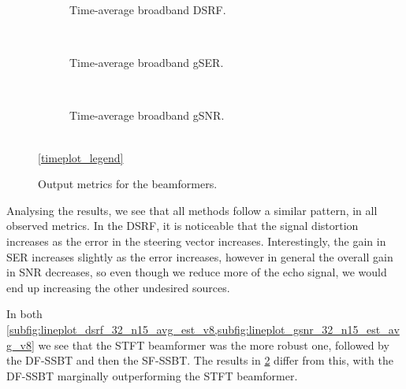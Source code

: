 \begin{figure}[!t]
	\centering
	\begin{subfigure}{\textwidth}
		\centering
		
		\caption{Time-average broadband DSRF.}
		\label{subfig:lineplot_dsrf_32_n15_avg_est_v8}
	\end{subfigure}\\[1em]
	\begin{subfigure}{\textwidth}
		\centering
		
		\caption{Time-average broadband gSER.}
		\label{subfig:lineplot_gser_32_n15_avg_est_v8}
	\end{subfigure}\\[1em]
	\begin{subfigure}{\textwidth}
		\centering
		
		\caption{Time-average broadband gSNR.}
		\label{subfig:lineplot_gsnr_32_n15_est_avg_v8}
	\end{subfigure}\\[1em]
	\ref*{timeplot_legend}
	\caption{Output metrics for the beamformers.}
	\label{fig:lineplots_32_n15_est_avg_v8}
\end{figure}

Analysing the results, we see that all methods follow a similar pattern, in all observed metrics. In the DSRF, it is noticeable that the signal distortion increases as the error in the steering vector increases. Interestingly, the gain in SER increases slightly as the error increases, however in general the overall gain in SNR decreases, so even though we reduce more of the echo signal, we would end up increasing the other undesired sources.

In both \cref{subfig:lineplot_dsrf_32_n15_avg_est_v8,subfig:lineplot_gsnr_32_n15_est_avg_v8} we see that the STFT beamformer was the more robust one, followed by the DF-SSBT and then the SF-SSBT. The results in \cref{subfig:lineplot_gser_32_n15_avg_est_v8} differ from this, with the DF-SSBT marginally outperforming the STFT beamformer.